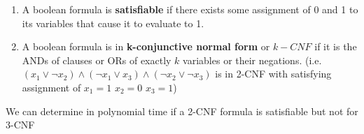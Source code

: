 \documentclass[11pt]{article}
\begin{document}
\begin{defn*}
\begin{enumerate}
\begin{enumerate}
\begin{enumerate}
\begin{enumerate}
                \end{enumerate}
                \item A boolean formula is \textbf{satisfiable} if there exists some assignment of 0 and 1 to its variables that cause it to evaluate to 1.
                \item  A boolean formula is in \textbf{k-conjunctive normal form} or $k-CNF$ if it is the ANDs of clauses or ORs of exactly $k$ variables or their negations.  (i.e. $(x_1 \lor \neg x_2) \land (\neg x_1 \lor x_3) \land (\neg x_2 \lor \neg x_3)$ is in 2-CNF with satisfying assignment of $x_1 = 1$ $x_2 = 0$ $x_3 = 1$)
            \end{enumerate}
            We can determine in polynomial time if a 2-CNF formula is satisfiable but not for 3-CNF
        \end{enumerate}
    \end{enumerate}
\end{defn*}
\end{document}
